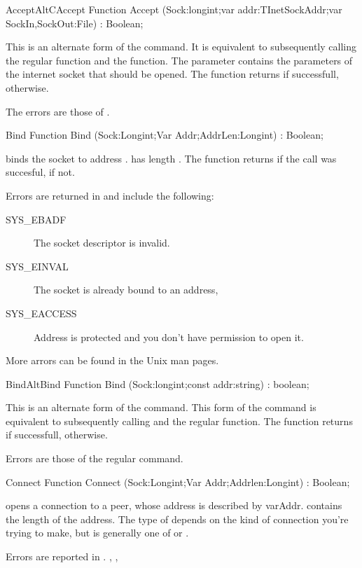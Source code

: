 \begin{functionl}{Accept}{AltCAccept}
\Declaration
Function Accept (Sock:longint;var addr:TInetSockAddr;var SockIn,SockOut:File) : Boolean;

\Description
 This is an alternate form of the  command. 
It is equivalent
to subsequently calling the regular  function and the 
 function.
The  parameter contains the parameters of the internet socket that
should be opened.
The function returns  if successfull,  otherwise.

\Errors
The errors are those of .
\SeeAlso
{}
\end{functionl}
\begin{function}{Bind}
\Declaration
Function Bind (Sock:Longint;Var Addr;AddrLen:Longint) : Boolean;

\Description
{} binds the socket  to address . 
has length .
The function returns  if the call was succesful,  if
not.

\Errors
Errors are returned in  and include the following:
\begin{description}
\item[SYS\_EBADF] The socket descriptor is invalid.
\item[SYS\_EINVAL] The socket is already bound to an address,
\item[SYS\_EACCESS] Address is protected and you don't have permission to
open it.
\end{description}
More arrors can be found in the Unix man pages.

\SeeAlso
{}
\end{function}
\begin{functionl}{Bind}{AltBind}
\Declaration
Function Bind (Sock:longint;const addr:string) : boolean;

\Description
This is an alternate form of the  command.
This form of the  command is equivalent to subsequently 
calling  and the regular  function.
The function returns  if successfull,  otherwise.

\Errors
Errors are those of the regular  command.
\SeeAlso
{}
\end{functionl}
\begin{function}{Connect}
\Declaration
Function Connect (Sock:Longint;Var Addr;Addrlen:Longint) : Boolean;

\Description
{} opens a connection to a peer, whose address is described by
var{Addr}.  contains the length of the address.
The type of  depends on the kind of connection you're trying to
make, but is generally one of  or .

\Errors
Errors are reported in .
\SeeAlso
{}, ,
\end{function}

